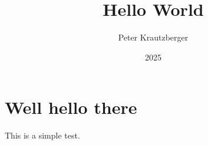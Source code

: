 \documentclass{amsart}
\begin{document}
\title{Hello World}
\author{Peter Krautzberger}
\date{2025}

\maketitle

\section{Well hello there}

This is a simple test.
\end{document}

